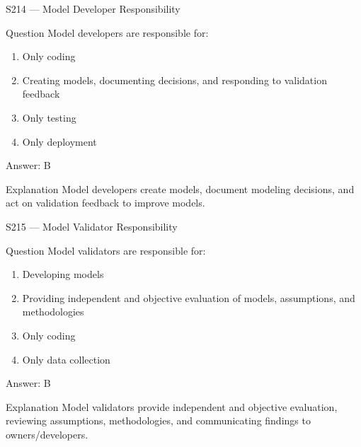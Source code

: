 \documentclass[aspectratio=169,8pt]{beamer}
\begin{document}
	\begin{frame}{S214 --- Model Developer Responsibility}
		\begin{block}{Question}
			Model developers are responsible for:
			\begin{enumerate}
				\item Only coding
				\item Creating models, documenting decisions, and responding to validation feedback
				\item Only testing
				\item Only deployment
			\end{enumerate}
		\end{block}
		\begin{exampleblock}{Answer: B}\end{exampleblock}
		\begin{block}{Explanation}
			Model developers create models, document modeling decisions, and act on validation feedback to improve models.
		\end{block}
	\end{frame}
	
	\begin{frame}{S215 --- Model Validator Responsibility}
		\begin{block}{Question}
			Model validators are responsible for:
			\begin{enumerate}
				\item Developing models
				\item Providing independent and objective evaluation of models, assumptions, and methodologies
				\item Only coding
				\item Only data collection
			\end{enumerate}
		\end{block}
		\begin{exampleblock}{Answer: B}\end{exampleblock}
		\begin{block}{Explanation}
			Model validators provide independent and objective evaluation, reviewing assumptions, methodologies, and communicating findings to owners/developers.
		\end{block}
	\end{frame}
	
\end{document}
